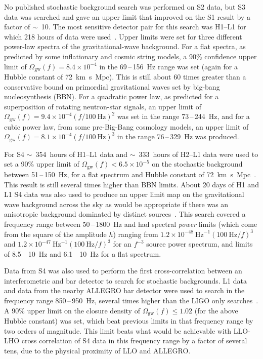 No published stochastic background search was performed on S2 data, but S3 data
was searched and gave an upper limit that improved on the S1 result by a factor
of $\sim$~10. The most sensitive detector pair for this search was H1--L1 for
which 218 hours of data were used~\cite{Abbott:2005h}. Upper limits were set for
three different power-law spectra of the gravitational-wave background. For a
flat spectra, as predicted by some inflationary and cosmic string models, a 90\%
confidence upper limit of $\Omega_{\mathrm{gw}}(f) = 8.4\times10^{-4}$ in the
69\,--\,156~Hz range was set (again for a Hubble constant of
72~km~s~Mpc). This is still about 60 times greater than a
conservative bound on primordial gravitational waves set by big-bang
nucleosynthesis (BBN). For a quadratic power law, as predicted for a
superposition of rotating neutron-star signals, an upper limit of
$\Omega_{\mathrm{gw}}(f) = 9.4\times10^{-4}(f/100 \mathrm{\ Hz})^2$ was set in the range 73\,--\,244~Hz,
and for a cubic power law, from some pre-Big-Bang cosmology models, an upper
limit of $\Omega_{\mathrm{gw}}(f) = 8.1\times10^{-4}(f/100 \mathrm{\ Hz})^3$ in the range
76\,--\,329~Hz was produced.


For S4 $\sim$~354~hours of H1--L1 data and $\sim$~333~hours of H2--L1 data were
used to set a 90\% upper limit of $\Omega_{\mathrm{gw}}(f) < 6.5\times10^{-5}$ on
the stochastic background between 51\,--\,150~Hz, for a flat spectrum and Hubble
constant of 72~km~s~Mpc~\cite{Abbott:2007e}. This result is
still several times higher than BBN limits. About 20 days of H1 and L1 S4 data
was also used to produce an upper limit map on the gravitational wave background
across the sky as would be appropriate if there was an anisotropic background
dominated by distinct sources~\cite{Abbott:2007f}. This search covered a
frequency range between 50\,--\,1800~Hz and had spectral \textit{power} limits (which
come from the square of the amplitude $h$) ranging from
$1.2\times10^{-48} \mathrm{\ Hz}^{-1} (100 \mathrm{\ Hz}/f)^3$ and
$1.2\times10^{-47} \mathrm{\ Hz}^{-1} (100 \mathrm{\ Hz}/f)^3$ for an
$f^{-3}$ source power spectrum, and limits of
8.5~\texttimes~10~Hz and
6.1~\texttimes~10~Hz for a flat spectrum.


Data from S4 was also used to perform the first cross-correlation between an
interferometric and bar detector to search for stochastic backgrounds. L1 data
and data from the nearby ALLEGRO bar detector were used to search in the
frequency range 850\,--\,950~Hz, several times higher than the LIGO only
searches~\cite{Abbott:2007g}. A 90\% upper limit on the closure
density of $\Omega_{\mathrm{gw}}(f) \leq 1.02$ (for the above Hubble
constant) was set, which beat previous limits in that frequency range
by two orders of magnitude. This limit beats what would be achievable
with LLO-LHO cross correlation of S4 data in this frequency range by a
factor of several tens, due to the physical proximity of LLO and ALLEGRO.



